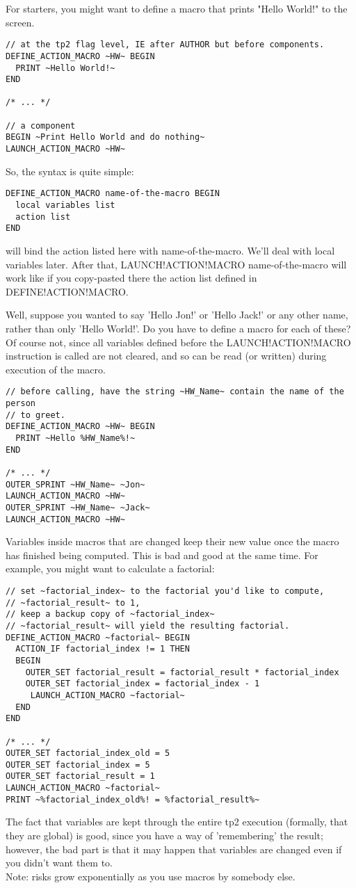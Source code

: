 \documentclass{article}
\begin{document}
For starters, you might want to define a macro that prints "Hello World!" to
the screen.

\begin{verbatim}
// at the tp2 flag level, IE after AUTHOR but before components.
DEFINE_ACTION_MACRO ~HW~ BEGIN
  PRINT ~Hello World!~
END

/* ... */

// a component
BEGIN ~Print Hello World and do nothing~
LAUNCH_ACTION_MACRO ~HW~
\end{verbatim}

So, the syntax is quite simple:
\begin{verbatim}
DEFINE_ACTION_MACRO name-of-the-macro BEGIN
  local variables list
  action list
END
\end{verbatim}
will bind the action listed here with name-of-the-macro. We'll deal with
local variables later. After that, LAUNCH!ACTION!MACRO name-of-the-macro
will work like if you copy-pasted there the action list defined in
DEFINE!ACTION!MACRO.

Well, suppose you wanted to say 'Hello Jon!' or 'Hello Jack!' or any other
name, rather than only 'Hello World!'. Do you have to define a macro for each
of these? Of course not, since all variables defined before the LAUNCH!ACTION!MACRO
instruction is called are not cleared, and so can be read (or written) during execution of the macro.

\begin{verbatim}
// before calling, have the string ~HW_Name~ contain the name of the person
// to greet.
DEFINE_ACTION_MACRO ~HW~ BEGIN
  PRINT ~Hello %HW_Name%!~
END

/* ... */
OUTER_SPRINT ~HW_Name~ ~Jon~
LAUNCH_ACTION_MACRO ~HW~
OUTER_SPRINT ~HW_Name~ ~Jack~
LAUNCH_ACTION_MACRO ~HW~
\end{verbatim}

Variables inside macros that are changed keep their new value once the
macro has finished being computed. This is bad and good at the same time.
For example, you might want to calculate a factorial:
\begin{verbatim}
// set ~factorial_index~ to the factorial you'd like to compute,
// ~factorial_result~ to 1,
// keep a backup copy of ~factorial_index~
// ~factorial_result~ will yield the resulting factorial.
DEFINE_ACTION_MACRO ~factorial~ BEGIN
  ACTION_IF factorial_index != 1 THEN
  BEGIN
    OUTER_SET factorial_result = factorial_result * factorial_index
    OUTER_SET factorial_index = factorial_index - 1
     LAUNCH_ACTION_MACRO ~factorial~
  END
END

/* ... */
OUTER_SET factorial_index_old = 5
OUTER_SET factorial_index = 5
OUTER_SET factorial_result = 1
LAUNCH_ACTION_MACRO ~factorial~
PRINT ~%factorial_index_old%! = %factorial_result%~
\end{verbatim}
The fact that variables are kept through the entire tp2 execution (formally,
that they are global) is good, since you have a way of 'remembering' the result;
however, the bad part is that it may happen that variables are changed even if you
didn't want them to.\\
Note: risks grow exponentially as you use macros by somebody else.
\end{document}
